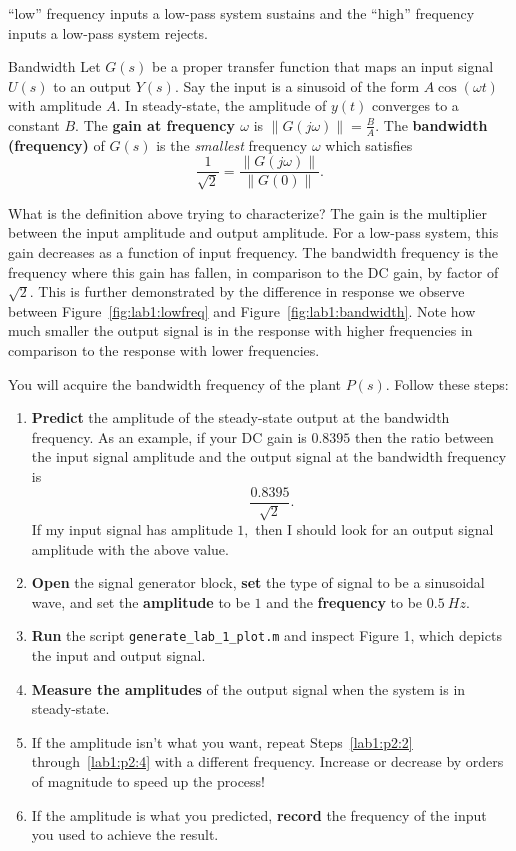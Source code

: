 ``low'' frequency inputs a low-pass system sustains and the ``high'' frequency
inputs a low-pass system rejects.
%
\begin{definition}[]{Bandwidth}
  Let \(G(s)\) be a proper transfer function
  that maps an input signal \(U(s)\) to an output \(Y(s).\)
%
  Say the input is a sinusoid of the form \(A \cos(\omega t)\) with amplitude
  \(A.\) In steady-state, the amplitude of \(y(t)\) converges to a constant
  \(B.\) The \textbf{gain at frequency \(\omega\)} is
  \(\left\|G(j\omega)\right\| = \frac{B}{A}.\)
%
  The \textbf{bandwidth (frequency)} of \(G(s)\) is the \emph{smallest}
  frequency \(\omega\) which satisfies
  \[
    \frac{1}{\sqrt{2}} = \frac{\left\|G(j\omega)\right\|}{\left\|G(0)\right\|}.
  \]
\end{definition}
%
What is the definition above trying to characterize? The
gain is the multiplier between the input amplitude and output amplitude. For
a low-pass system, this gain decreases as a function of input frequency. The
bandwidth frequency is the frequency where this gain has fallen, in comparison
to the DC gain, by factor of \(\sqrt{2}.\) This is further demonstrated
by the difference in response we observe between Figure~\ref{fig:lab1:lowfreq}
and Figure~\ref{fig:lab1:bandwidth}. Note how much smaller the output signal
is in the response with higher frequencies in comparison to the response
with lower frequencies.
%
\begin{procedure}[label={proc:lab1:p2}]
  You will acquire the bandwidth frequency of the plant \(P(s)\).
  Follow these steps:
  \begin{enumerate}[label=(\arabic*)]
    \item{
      \textbf{Predict} the amplitude of the steady-state output at the
      bandwidth frequency. As an example, if your DC gain is \(0.8395\) then
      the ratio between the input signal amplitude and the output signal
      at the bandwidth frequency is
      \[
        \frac{0.8395}{\sqrt{2}}.
      \]
      If my input signal has amplitude \(1,\) then I should look for
      an output signal amplitude with the above value.
    }
    \item{
      \label{lab1:p2:2}
      \textbf{Open} the signal generator block, \textbf{set} the type of signal
      to be a sinusoidal wave, and set the
      \textbf{amplitude} to be \(1\) and
      the \textbf{frequency} to be \(\SI{0.5}{Hz}.\)
    }
    \item{
      \textbf{Run} the script \texttt{generate\_lab\_1\_plot.m} and inspect
      Figure 1, which depicts the input and output signal.
    }
    \item{
      \label{lab1:p2:4}
      \textbf{Measure the amplitudes} of the output signal
      when the system is in steady-state.
    }
    \item{
      If the amplitude isn't what you want, repeat Steps~\ref{lab1:p2:2} through~\ref{lab1:p2:4} with a different frequency. Increase or decrease
      by orders of magnitude to speed up the process!
    }
    \item{
      If the amplitude is what you predicted, \textbf{record} the frequency
      of the input you used to achieve the result.
    }
  \end{enumerate}
\end{procedure}

